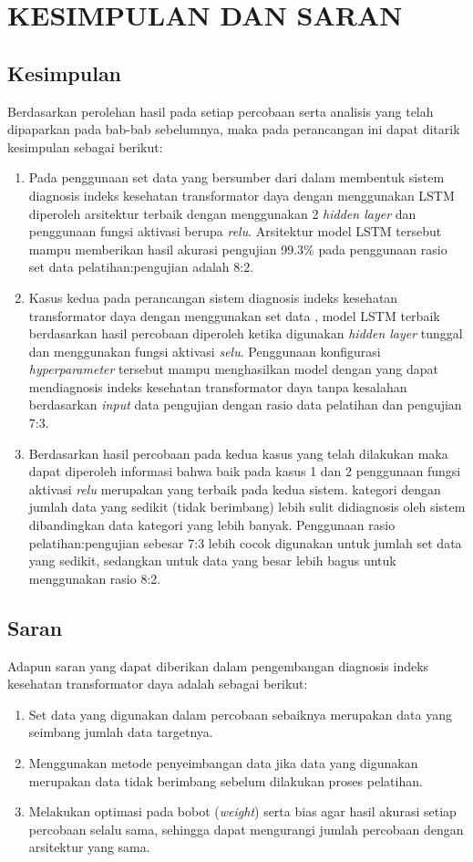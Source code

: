\chapter{KESIMPULAN DAN SARAN}

\section{Kesimpulan}
Berdasarkan perolehan hasil pada setiap percobaan serta analisis yang telah dipaparkan pada bab-bab sebelumnya, maka pada perancangan ini dapat ditarik kesimpulan sebagai berikut:
\begin{enumerate}
	\item Pada penggunaan set data yang bersumber dari \cite{shah2016predict} dalam membentuk sistem diagnosis indeks kesehatan transformator daya dengan menggunakan LSTM diperoleh arsitektur terbaik dengan menggunakan 2 \textit{hidden layer} dan penggunaan fungsi aktivasi berupa \textit{relu}. Arsitektur model LSTM tersebut mampu memberikan hasil akurasi pengujian 99.3\% pada penggunaan rasio set data pelatihan:pengujian adalah 8:2.
	\item Kasus kedua pada perancangan sistem diagnosis indeks kesehatan transformator daya dengan menggunakan set data \cite{abu2012calculation}, model LSTM terbaik berdasarkan hasil percobaan diperoleh ketika digunakan \textit{hidden layer} tunggal dan menggunakan fungsi aktivasi \textit{selu}. Penggunaan konfigurasi \textit{hyperparameter} tersebut mampu menghasilkan model dengan yang dapat mendiagnosis indeks kesehatan transformator daya tanpa kesalahan berdasarkan \textit{input} data pengujian dengan rasio data pelatihan dan pengujian 7:3.
	\item Berdasarkan hasil percobaan pada kedua kasus yang telah dilakukan maka dapat diperoleh informasi bahwa baik pada kasus 1 dan 2 penggunaan fungsi aktivasi \textit{relu} merupakan yang terbaik pada kedua sistem. kategori dengan jumlah data yang sedikit (tidak berimbang) lebih sulit didiagnosis oleh sistem dibandingkan data kategori yang lebih banyak. Penggunaan rasio pelatihan:pengujian sebesar 7:3 lebih cocok digunakan untuk jumlah set data yang sedikit, sedangkan untuk data yang besar lebih bagus untuk menggunakan rasio 8:2.
\end{enumerate}

\section{Saran}
Adapun saran yang dapat diberikan dalam pengembangan diagnosis indeks kesehatan transformator daya adalah sebagai berikut:
\begin{enumerate}
	\item Set data yang digunakan dalam percobaan sebaiknya merupakan data yang seimbang jumlah data targetnya.
	\item Menggunakan metode penyeimbangan data jika data yang digunakan merupakan data tidak berimbang sebelum dilakukan proses pelatihan.
	\item Melakukan optimasi pada bobot (\textit{weight}) serta bias agar hasil akurasi setiap percobaan selalu sama, sehingga dapat mengurangi jumlah percobaan dengan arsitektur yang sama.
\end{enumerate}